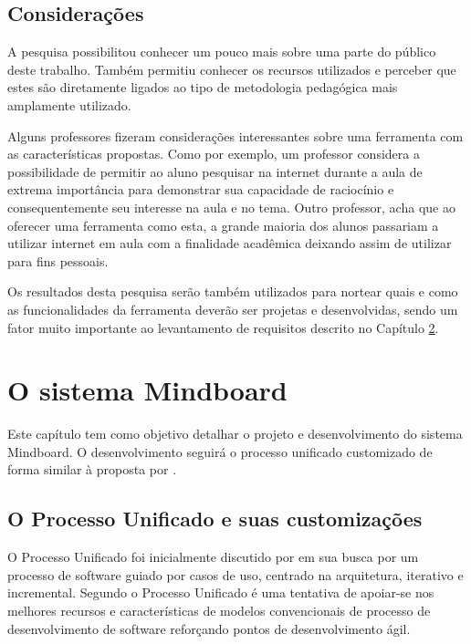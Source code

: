 \section{Considerações}

A pesquisa possibilitou conhecer um pouco mais sobre uma parte do público deste trabalho. Também permitiu conhecer os recursos utilizados e perceber que estes são diretamente ligados ao tipo de metodologia pedagógica mais amplamente utilizado.

Alguns professores fizeram considerações interessantes sobre uma ferramenta com as características propostas. Como por exemplo, um professor considera a possibilidade de permitir ao aluno pesquisar na internet durante a aula de extrema importância para demonstrar sua capacidade de raciocínio e consequentemente seu interesse na aula e no tema. Outro professor, acha que ao oferecer uma ferramenta como esta, a grande maioria dos alunos passariam a utilizar internet em aula com a finalidade acadêmica deixando assim de utilizar para fins pessoais.

Os resultados desta pesquisa serão também utilizados para nortear quais e como as funcionalidades da ferramenta deverão ser projetas e desenvolvidas, sendo um fator muito importante ao levantamento de requisitos descrito no Capítulo \ref{cap:mindboard}.


\chapter{O sistema Mindboard}
\label{cap:mindboard}

Este capítulo tem como objetivo detalhar o projeto e desenvolvimento do sistema Mindboard. O desenvolvimento seguirá o processo unificado customizado de forma similar à proposta por .

\section{O Processo Unificado e suas customizações}

O Processo Unificado foi inicialmente discutido por  em sua busca por um processo de software guiado por casos de uso, centrado na arquitetura, iterativo e incremental. Segundo  o Processo Unificado é uma tentativa de apoiar-se nos melhores recursos e características de modelos convencionais de processo de desenvolvimento de software reforçando pontos de desenvolvimento ágil.


